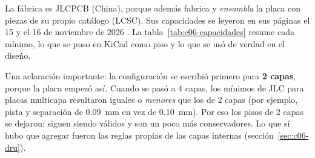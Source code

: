 La fábrica es JLCPCB (China), porque además fabrica y \emph{ensambla} la placa con piezas de su propio catálogo
(LCSC). Sus capacidades se leyeron en sus páginas el 15 y el 16 de noviembre de 2026
. La tabla~\ref{tab:c06-capacidades} resume cada mínimo, lo que se
puso en KiCad como piso y lo que se usó de verdad en el diseño.

Una aclaración importante: la configuración se escribió primero para \textbf{2 capas}, porque la placa empezó así.
Cuando se pasó a 4 capas, los mínimos de JLC para placas multicapa resultaron iguales o \emph{menores} que los de
2 capas (por ejemplo, pista y separación de \SI{0.09}{\milli\meter} en vez de \SI{0.10}{\milli\meter}). Por eso los
pisos de 2 capas se dejaron: siguen siendo válidos y son un poco más conservadores. Lo que sí hubo que agregar
fueron las reglas propias de las capas internas (sección~\ref{sec:c06-dru}).


